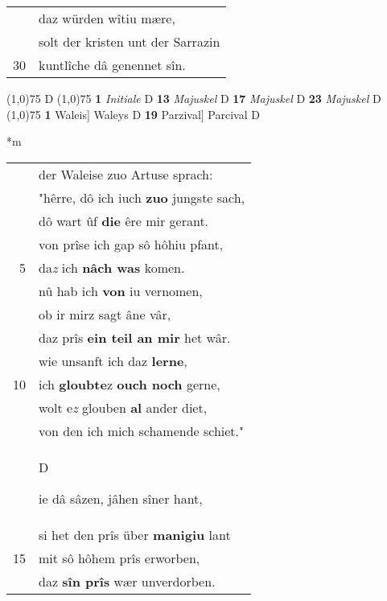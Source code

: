 \documentclass[8pt,a4paper,notitlepage]{article}
\begin{document}
\begin{table}[ht]
\begin{minipage}[t]{0.5\linewidth}
\begin{tabular}{rl}
 & daz würden wîtiu mære,\\ 
 & solt der kristen unt der Sarrazin\\ 
30 & kuntlîche dâ genennet sîn.\\ 
\end{tabular}
\scriptsize
\line(1,0){75} \newline
D \newline
\line(1,0){75} \newline
\textbf{1} \textit{Initiale} D  \textbf{13} \textit{Majuskel} D  \textbf{17} \textit{Majuskel} D  \textbf{23} \textit{Majuskel} D  \newline
\line(1,0){75} \newline
\textbf{1} Waleis] Waleys D \textbf{19} Parzival] Parcival D \newline
\end{minipage}
\hspace{0.5cm}
\begin{minipage}[t]{0.5\linewidth}
\small
\begin{center}*m
\end{center}
\begin{tabular}{rl}
 & der Waleise zuo Artuse sprach:\\ 
 & "hêrre, dô ich iuch \textbf{zuo} jungste sach,\\ 
 & dô wart ûf \textbf{die} êre mir gerant.\\ 
 & von prîse ich gap sô hôhiu pfant,\\ 
5 & da\textit{z} ich  \textbf{nâch was} komen.\\ 
 & nû hab ich \textbf{von} iu vernomen,\\ 
 & ob ir mirz sagt âne vâr,\\ 
 & daz prîs \textbf{ein teil an mir} het wâr.\\ 
 & wie unsanft ich daz \textbf{lerne},\\ 
10 & ich \textbf{gloubte}z \textbf{ouch noch} gerne,\\ 
 & wolt e\textit{z} glouben \textbf{al} ander diet,\\ 
 & von den ich mich schamende schiet."\\ 
 & \begin{large}D\end{large}ie dâ sâzen, jâhen sîner hant,\\ 
 & si het den prîs über \textbf{manigiu} lant\\ 
15 & mit sô hôhem prîs erworben,\\ 
 & daz \textbf{sîn prîs} wær unverdorben.\\ 

\end{tabular}
\end{minipage}
\end{table}
\end{document}
